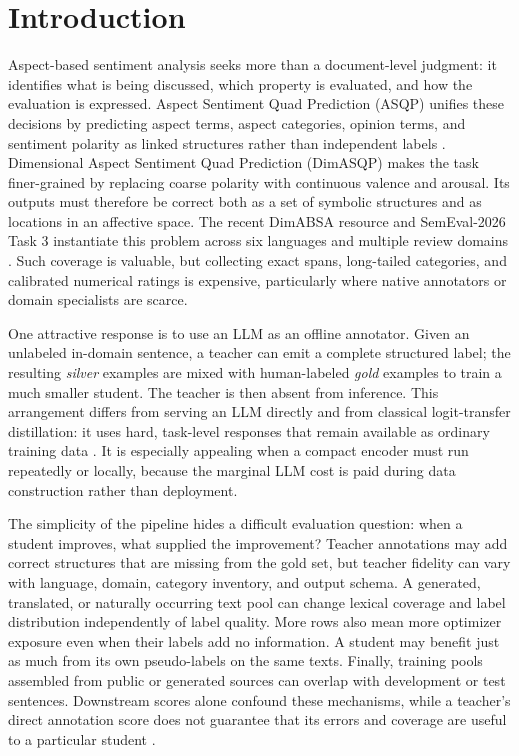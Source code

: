 \section{Introduction}\label{introduction}

Aspect-based sentiment analysis seeks more than a document-level
judgment: it identifies what is being discussed, which property is
evaluated, and how the evaluation is expressed. Aspect Sentiment Quad
Prediction (ASQP) unifies these decisions by predicting aspect terms,
aspect categories, opinion terms, and sentiment polarity as linked
structures rather than independent labels
\citep{cai2021acos,zhang2021asqp}. Dimensional Aspect Sentiment Quad
Prediction (DimASQP) makes the task finer-grained by replacing coarse
polarity with continuous valence and arousal. Its outputs must therefore
be correct both as a set of symbolic structures and as locations in an
affective space. The recent DimABSA resource and SemEval-2026 Task 3
instantiate this problem across six languages and multiple review
domains \citep{lee2026dimabsa,yu2026semeval}. Such coverage is valuable,
but collecting exact spans, long-tailed categories, and calibrated
numerical ratings is expensive, particularly where native annotators or
domain specialists are scarce.

One attractive response is to use an LLM as an offline annotator. Given
an unlabeled in-domain sentence, a teacher can emit a complete
structured label; the resulting \emph{silver} examples are mixed with
human-labeled \emph{gold} examples to train a much smaller student. The
teacher is then absent from inference. This arrangement differs from
serving an LLM directly and from classical logit-transfer distillation:
it uses hard, task-level responses that remain available as ordinary
training data
\citep{hinton2015distilling,hsieh2023distilling,golde2023fabricator}. It
is especially appealing when a compact encoder must run repeatedly or
locally, because the marginal LLM cost is paid during data construction
rather than deployment.

The simplicity of the pipeline hides a difficult evaluation question:
when a student improves, what supplied the improvement? Teacher
annotations may add correct structures that are missing from the gold
set, but teacher fidelity can vary with language, domain, category
inventory, and output schema. A generated, translated, or naturally
occurring text pool can change lexical coverage and label distribution
independently of label quality. More rows also mean more optimizer
exposure even when their labels add no information. A student may
benefit just as much from its own pseudo-labels on the same texts.
Finally, training pools assembled from public or generated sources can
overlap with development or test sentences. Downstream scores alone
confound these mechanisms, while a teacher's direct annotation score
does not guarantee that its errors and coverage are useful to a
particular student \citep{ding2023annotator,zhang2023llmaaa}.

